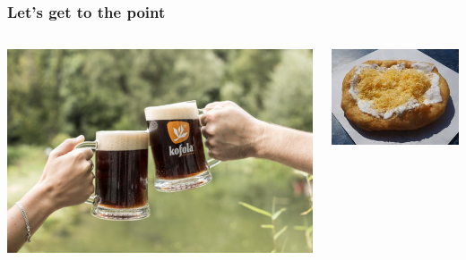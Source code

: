 \documentclass{beamer}
\begin{document}
	\begin{frame}
		\frametitle{Let's get to the point}
		
		\begin{columns}
		\begin{column}{0.5\textwidth}
		\includegraphics[width=\textwidth]{day4/kofola}
		\end{column}
		\begin{column}{0.5\textwidth}
		\includegraphics[width=\textwidth]{day4/langos}
		\end{column}
		\end{columns}

		\pause		


\end{frame}
\end{document}
